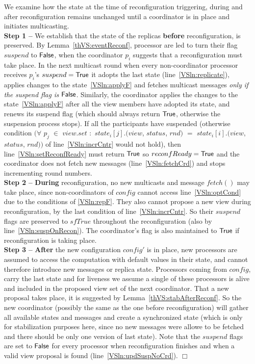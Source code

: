 \documentclass[11pt]{article}
\newcommand{\rep}{state}
\newenvironment{proof}{\noindent{\bf Proof.}}{\hfill$\Box$}
\begin{document}
\begin{proof}
We examine how the state at the time of reconfiguration triggering, during and after reconfiguration remains unchanged until a coordinator is in place and initiates multicasting.\\
\textbf{Step 1 --} We establish that the state of the replicas \textbf{before} reconfiguration, is preserved.
By Lemma~\ref{thVS:eventReconf}, processor are led to turn their flag $suspend$ to $\sf False$, when the coordinator $p_i$ suggests that a reconfiguration must take place.
In the next multicast round when every non-coordinator processor receives $p_i$'s $suspend = \sf True$ it adopts the last state (line~\ref{VSln:replicate}), applies changes to the state~\ref{VSln:applyF} and fetches multicast messages \emph{only if the suspend flag is $\sf False$}.
Similarly, the coordinator applies the changes to the state~\ref{VSln:applyF} after all the view members have adopted its state, and renews its suspend flag (which should always return $\sf True$, otherwise the suspension process stops). 
If all the participants have suspended (otherwise condition $(\forall$ $p_j$ $\in$ $view.set$ $:$ $\rep_i[j].(view$, $status$, $rnd)$ $=$ $\rep_i[i].(view$, $status$, $rnd))$  of line~\ref{VSln:incrCntr} would not hold), then line~\ref{VSln:setReconfReady} must return $\sf True$ so $reconfReady = \sf True$ and the coordinator does not fetch new messages (line~\ref{VSln:fetchCrd}) and stops incrementing round numbers. \\
\textbf{Step 2 -- } \textbf{During} reconfiguration, no new multicasts and message $fetch()$ may take place, since non-coordinators of $config$ cannot access line~\ref{VSln:optCond} due to the conditions of \ref{VSln:repF}.
They also cannot propose a new view during reconfiguration, by the last condition of line~\ref{VSln:incrCntr}.
So their $suspend$ flags are preserved to $sf True$ throughout the reconfiguration (also by line~\ref{VSln:suspOnRecon}).
The coordinator's flag is also maintained to $\sf True$ if reconfiguration is taking place. \\
\textbf{Step 3 --} \textbf{After} the new configuration $config'$ is in place, new processors are assumed to access the computation with default values in their state, and cannot therefore introduce new messages or replica state.
Processors coming from $config$, carry the last state and for liveness we assume a single of these processors is alive and included in the proposed view set of the next coordinator. That a new proposal takes place, it is suggested by Lemma~\ref{thVS:stabAfterReconf}.
So the new coordinator (possibly the same as the one before reconfiguration) will gather all available states and messages and create a synchronized state (which is only for stabilization purposes here, since no new messages were allowe to be fetched and there should be only one version of last state).
Note that the $suspend$ flags are set to $\sf False$ for every processor when reconfiguration finishes and when a valid view proposal is found (line~\ref{VSln:updSuspNoCrd}).
\end{proof}\\
\end{document}
